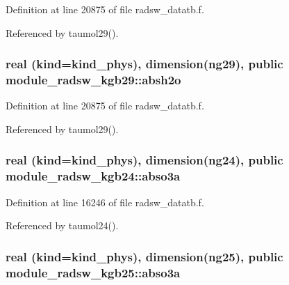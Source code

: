 Definition at line 20875 of file radsw\+\_\+datatb.\+f.



Referenced by taumol29().

\subsubsection[{\texorpdfstring{absh2o}{absh2o}}]{\setlength{\rightskip}{0pt plus 5cm}real (kind=kind\+\_\+phys), dimension(ng29), public module\+\_\+radsw\+\_\+kgb29\+::absh2o}\hypertarget{group__module__radsw__main_gacab70725ca7faf002f04306fe1798e02}{}\label{group__module__radsw__main_gacab70725ca7faf002f04306fe1798e02}


Definition at line 20875 of file radsw\+\_\+datatb.\+f.



Referenced by taumol29().

\subsubsection[{\texorpdfstring{abso3a}{abso3a}}]{\setlength{\rightskip}{0pt plus 5cm}real (kind=kind\+\_\+phys), dimension(ng24), public module\+\_\+radsw\+\_\+kgb24\+::abso3a}\hypertarget{group__module__radsw__main_ga3df78e9baa46df182aad6ff9b1662dc4}{}\label{group__module__radsw__main_ga3df78e9baa46df182aad6ff9b1662dc4}


Definition at line 16246 of file radsw\+\_\+datatb.\+f.



Referenced by taumol24().

\subsubsection[{\texorpdfstring{abso3a}{abso3a}}]{\setlength{\rightskip}{0pt plus 5cm}real (kind=kind\+\_\+phys), dimension(ng25), public module\+\_\+radsw\+\_\+kgb25\+::abso3a}\hypertarget{group__module__radsw__main_gab02765dac8ca71a439cdaf1ed2691851}{}\label{group__module__radsw__main_gab02765dac8ca71a439cdaf1ed2691851}


